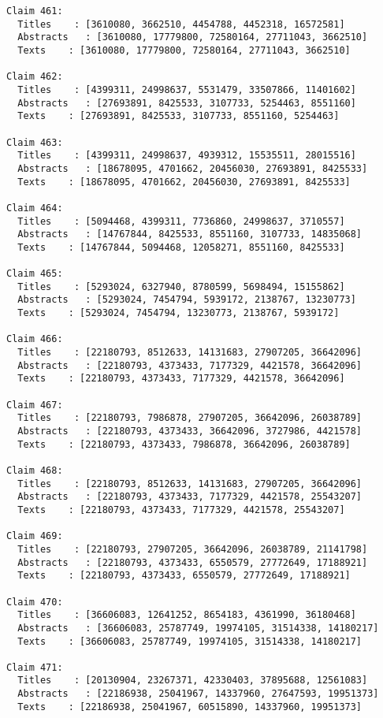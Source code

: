 \documentclass[11pt]{article}
\begin{document}
\begin{Verbatim}[commandchars=\\\{\}]
Claim 461:
  Titles    : [3610080, 3662510, 4454788, 4452318, 16572581]
  Abstracts   : [3610080, 17779800, 72580164, 27711043, 3662510]
  Texts    : [3610080, 17779800, 72580164, 27711043, 3662510]

Claim 462:
  Titles    : [4399311, 24998637, 5531479, 33507866, 11401602]
  Abstracts   : [27693891, 8425533, 3107733, 5254463, 8551160]
  Texts    : [27693891, 8425533, 3107733, 8551160, 5254463]

Claim 463:
  Titles    : [4399311, 24998637, 4939312, 15535511, 28015516]
  Abstracts   : [18678095, 4701662, 20456030, 27693891, 8425533]
  Texts    : [18678095, 4701662, 20456030, 27693891, 8425533]

Claim 464:
  Titles    : [5094468, 4399311, 7736860, 24998637, 3710557]
  Abstracts   : [14767844, 8425533, 8551160, 3107733, 14835068]
  Texts    : [14767844, 5094468, 12058271, 8551160, 8425533]

Claim 465:
  Titles    : [5293024, 6327940, 8780599, 5698494, 15155862]
  Abstracts   : [5293024, 7454794, 5939172, 2138767, 13230773]
  Texts    : [5293024, 7454794, 13230773, 2138767, 5939172]

Claim 466:
  Titles    : [22180793, 8512633, 14131683, 27907205, 36642096]
  Abstracts   : [22180793, 4373433, 7177329, 4421578, 36642096]
  Texts    : [22180793, 4373433, 7177329, 4421578, 36642096]

Claim 467:
  Titles    : [22180793, 7986878, 27907205, 36642096, 26038789]
  Abstracts   : [22180793, 4373433, 36642096, 3727986, 4421578]
  Texts    : [22180793, 4373433, 7986878, 36642096, 26038789]

Claim 468:
  Titles    : [22180793, 8512633, 14131683, 27907205, 36642096]
  Abstracts   : [22180793, 4373433, 7177329, 4421578, 25543207]
  Texts    : [22180793, 4373433, 7177329, 4421578, 25543207]

Claim 469:
  Titles    : [22180793, 27907205, 36642096, 26038789, 21141798]
  Abstracts   : [22180793, 4373433, 6550579, 27772649, 17188921]
  Texts    : [22180793, 4373433, 6550579, 27772649, 17188921]

Claim 470:
  Titles    : [36606083, 12641252, 8654183, 4361990, 36180468]
  Abstracts   : [36606083, 25787749, 19974105, 31514338, 14180217]
  Texts    : [36606083, 25787749, 19974105, 31514338, 14180217]

Claim 471:
  Titles    : [20130904, 23267371, 42330403, 37895688, 12561083]
  Abstracts   : [22186938, 25041967, 14337960, 27647593, 19951373]
  Texts    : [22186938, 25041967, 60515890, 14337960, 19951373]


\end{Verbatim}
\end{document}
